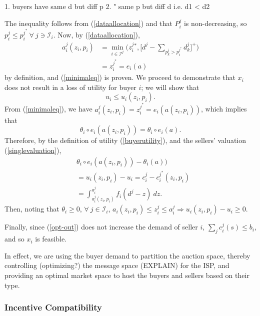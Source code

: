 \documentclass[12pt]{article}
\theoremstyle{definition}
\newcommand{\mcI}{\mathcal{I}}
\begin{document}
\begin{multicols}{2}
1. buyers have same d but diff p
2. " same p but diff d i.e. d1 < d2

The inequality follows from
(\ref{dataallocation}) and that $P_i^j$ is non-decreasing, so $p_i^j \le p_i^{j^*} \ \forall \ j \ni \mcI_i$.
Now, by (\ref{dataallocation}),
\begin{align*}
     a_i^j(z_i,p_i) &=\min_{i\in\mcI^j}\bigg(z_i^j{^*}, \bigg\lbrack d^{j} - \sum_{p_k^{j}> p_i^{j^*}}
d_k^{j}\bigg\rbrack^+\bigg) \\
    &= z_i^{j^*}= e_i(a)
\end{align*}
by definition, and (\ref{minimaleq}) is proven.
We proceed to demonstrate that $x_i$ does not result in a loss of utility for
buyer $i$; we will show that
$$
    u_i \le u_i(z_i,p_i).
$$
From (\ref{minimaleq}), we have $a_i^{j}(z_i,p_i) = z_i^{j^*} = e_i(a(z_i,p_i))$, which
implies that 
$$
\theta_i\circ e_i(a(z_i,p_i)) = \theta_i\circ e_i(a).
$$ 
Therefore, by the definition of utility (\ref{buyerutility}),
and the sellers' valuation (\ref{singlevaluation}), 
\begin{align*}
    &\theta_i\circ e_i(a(z_i,p_i)) - \theta_i(a)) \\
    &= u_i(z_i,p_i) - u_i =  c_i^j -c_i^{j^*}(z_i,p_i)\\
    &= \displaystyle\int_{a_i^j(z_i,p_i)}^{a_i^j} f_i(d^j - z) \ dz.
\end{align*}
Then, noting that $\theta_i\ge 0$, $\forall \ j\in\mcI_i$, $a_i(z_i,p_i) \le
z_i^j \le a_i^j \Rightarrow u_i(z_i,p_i) - u_i \ge 0$.


Finally, since (\ref{opt-out}) does
not increase the demand of seller $i$, $\sum_j c_i^j(s) \le b_i$, and so $x_i$ is feasible.

In effect, we are using the buyer demand
to partition the auction space, thereby 
controlling (optimizing?) the message space (EXPLAIN) for the
ISP, and providing an optimal market space to host the buyers and sellers based
on their type. \\

\subsubsection{Incentive Compatibility}


\end{multicols}
\end{document}
